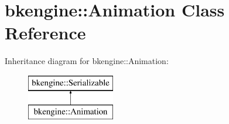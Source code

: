 \hypertarget{classbkengine_1_1Animation}{}\section{bkengine\+:\+:Animation Class Reference}
\label{classbkengine_1_1Animation}
Inheritance diagram for bkengine\+:\+:Animation\+:\begin{figure}[H]
\begin{center}
\leavevmode
\includegraphics[height=2.000000cm]{classbkengine_1_1Animation}
\end{center}
\end{figure}
